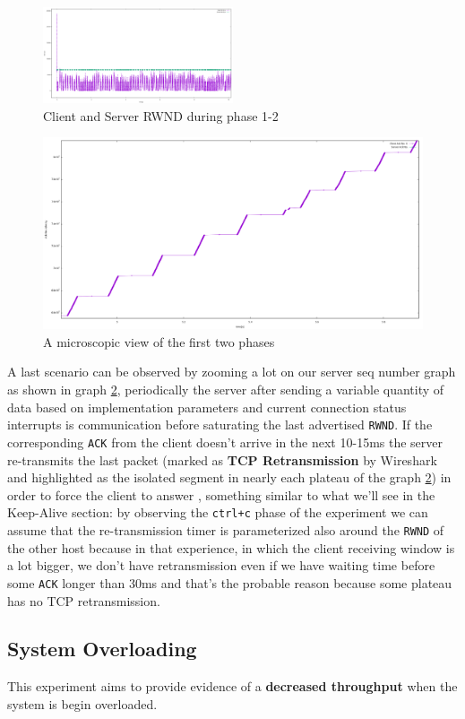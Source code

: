\documentclass{exam}
\begin{document}
\begin{figure}[H]
    \centering
    \includegraphics[width=0.50\textwidth]{rwnd_1-2.png}
    \caption{Client and Server RWND during phase 1-2}
    \label{fig:rwnd_1-2}
\end{figure}
\begin{figure}[H]
    \centering
    \includegraphics[width=0.50\linewidth]{step_1-2.png}
    \caption{A microscopic view of the first two phases}
    \label{fig:step_1-2}
\end{figure}

A last scenario can be observed by zooming a lot on our server seq number graph as shown in graph \ref{fig:step_1-2}, periodically the server after sending a variable quantity of data based on implementation parameters and current connection status interrupts is communication before saturating the last advertised \verb|RWND|. If the corresponding \verb|ACK| from the client doesn't arrive in the next 10-15ms the server re-transmits the last packet (marked as \textbf{TCP Retransmission} by Wireshark and highlighted as the isolated segment in nearly each plateau of the graph \ref{fig:step_1-2}) in order to force the client to answer , something similar to what we'll see in the Keep-Alive section: by observing the \verb|ctrl+c| phase of the experiment we can assume that the re-transmission timer is parameterized also around the \verb|RWND| of the other host because in that experience, in which the client receiving window is a lot bigger, we don't have retransmission even if we have waiting time before some \verb|ACK| longer than 30ms and that's the probable reason because some plateau has no TCP retransmission.

\subsection{System Overloading}
This experiment aims to provide evidence of a \textbf{decreased throughput} when the system is begin overloaded.
\end{document}
